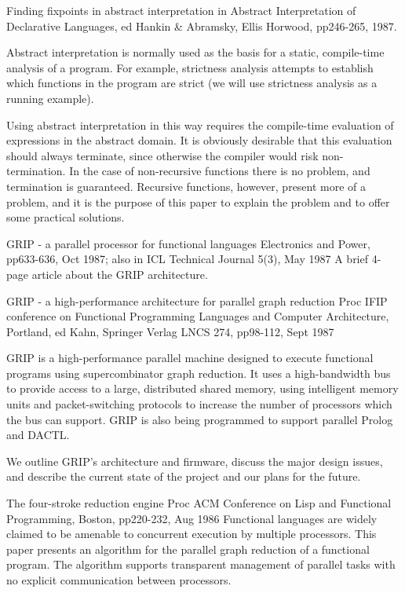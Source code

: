 {Finding fixpoints in abstract interpretation} 
{in Abstract Interpretation of Declarative Languages,
ed Hankin \& Abramsky, Ellis Horwood, pp246-265, 1987.}
{
Abstract interpretation is normally used as the basis for
a static, compile-time analysis of a program.
For example, strictness analysis attempts to establish which
functions in the program are strict (we will use strictness
analysis as a running example).

Using abstract interpretation in this way requires the
compile-time evaluation of expressions in the abstract domain.
It is obviously desirable that this evaluation should
always terminate, since otherwise the compiler would risk
non-termination.
In the case of non-recursive functions there is no problem, and
termination is guaranteed.
Recursive functions, however, present more of a problem, and it
is the purpose of this paper to explain the problem and to
offer some practical solutions.
}

{GRIP - a parallel processor for functional languages}
{Electronics and Power, pp633-636, Oct 1987;
also in ICL Technical Journal 5(3), May 1987}
{
A brief 4-page article about the GRIP architecture.
}

{GRIP - a high-performance architecture for parallel graph reduction}
{Proc IFIP conference on Functional Programming Languages and 
Computer Architecture, Portland,
ed Kahn, Springer Verlag LNCS 274, pp98-112, Sept 1987}
{
GRIP is a high-performance parallel machine designed to execute
functional programs using supercombinator graph reduction.
It uses a high-bandwidth bus to provide access to a
large, distributed shared memory, using intelligent memory units and
packet-switching protocols to increase the number of processors
which the bus can support.
GRIP is also being programmed to support parallel Prolog and
DACTL.

We outline GRIP's architecture and firmware, discuss the major design
issues, and describe the current state of the project and
our plans for the future.
}
{The four-stroke reduction engine}
{Proc ACM Conference on Lisp and Functional Programming,
Boston, pp220-232, Aug 1986}
{
Functional languages are widely claimed to be amenable to concurrent
execution by multiple processors.  This paper presents an algorithm for
the parallel graph reduction of a functional program.
The algorithm supports transparent management of parallel 
tasks with no explicit
communication between processors.
}

